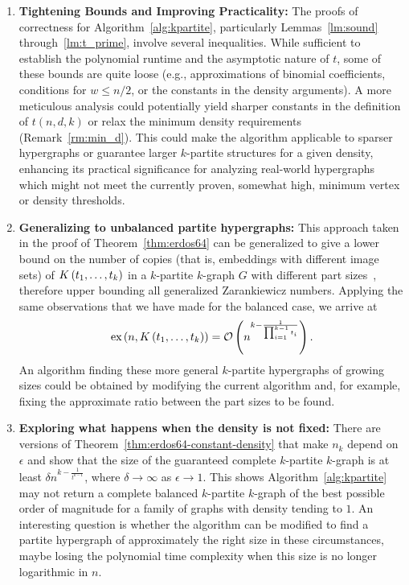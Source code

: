 \begin{enumerate}
    \item \textbf{Tightening Bounds and Improving Practicality:}
    The proofs of correctness for Algorithm~\ref{alg:kpartite}, particularly Lemmas~\ref{lm:sound} through~\ref{lm:t_prime},
    involve several inequalities.
    While sufficient to establish the polynomial runtime and the asymptotic nature of $t$,
    some of these bounds are quite loose (e.g., approximations of binomial coefficients, conditions for $w \leq n/2$,
    or the constants in the density arguments).
    A more meticulous analysis could potentially yield sharper constants in the definition of
    $t(n,d,k)$ or relax the minimum density requirements (Remark~\ref{rm:min_d}).
    This could make the algorithm applicable to sparser hypergraphs or guarantee larger $k$-partite structures for a given density,
    enhancing its practical significance for analyzing real-world hypergraphs which might not meet the currently proven,
    somewhat high, minimum vertex or density thresholds.

    \item \textbf{Generalizing to unbalanced partite hypergraphs:}
    This approach taken in the proof of Theorem~\ref{thm:erdos64}
    can be generalized to give a lower bound on the number of
    copies (that is, embeddings with different image sets)
    of $K\left(t_1, \dots, t_k\right)$ in a $k$-partite $k$-graph $G$
    with different part sizes~\cite{carvajal2024canonical},
    therefore upper bounding all generalized Zarankiewicz numbers.
    Applying the same observations that we have made for the balanced case,
    we arrive at
    \begin{equation} \label{eq:general-partite-bound}
        \text{ex} \left( n, K\left(t_1, \dots, t_k\right) \right) = \mathcal{O}\left(n^{k - \frac{1}{\prod_{i=1}^{k-1} t_i}}\right).
    \end{equation}
    An algorithm finding these more general $k$-partite hypergraphs
    of growing sizes could be obtained by modifying the current algorithm
    and, for example, fixing the approximate ratio between the part sizes to be found.

    \item \textbf{Exploring what happens when the density is not fixed:}
    There are versions of Theorem~\ref{thm:erdos64-constant-density}
    that make $n_k$ depend on $\epsilon$ and show that the size of the
    guaranteed complete $k$-partite $k$-graph is at least $\delta n^{k-\frac{1}{t^{k-1}}}$,
    where $\delta \to \infty$ as $\epsilon \to 1$.
    This shows Algorithm~\ref{alg:kpartite} may not return a complete balanced $k$-partite
    $k$-graph of the best possible order of magnitude for a family of graphs with density tending to $1$.
    An interesting question is whether the algorithm can be modified to find
    a partite hypergraph of approximately the right size in these circumstances,
    maybe losing the polynomial time complexity when this size is no longer logarithmic in $n$.


\end{enumerate}
